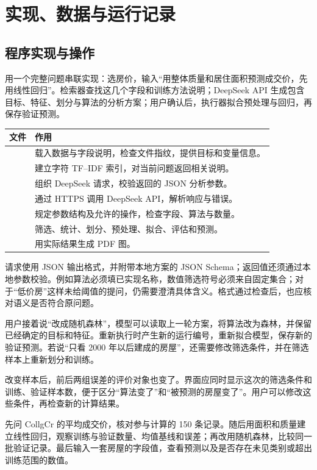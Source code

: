\section{实现、数据与运行记录}\label{app:implementation}
\subsection{程序实现与操作}
用一个完整问题串联实现：选房价，输入“用整体质量和居住面积预测成交价，先用线性回归”。检索器查找这几个字段和训练方法说明；DeepSeek API 生成包含目标、特征、划分与算法的分析方案；用户确认后，执行器拟合预处理与回归，再保存验证预测。
\begin{center}\small
\begin{tabularx}{\textwidth}{lY}
\toprule
文件 & 作用\\
\midrule
{} & 载入数据与字段说明，检查文件指纹，提供目标和变量信息。\\
 & 建立字符 TF--IDF 索引，对当前问题返回相关说明。\\
 & 组织 DeepSeek 请求，校验返回的 JSON 分析参数。\\
 & 通过 HTTPS 调用 DeepSeek API，解析响应与错误。\\
 & 规定参数结构及允许的操作，检查字段、算法与数量。\\
 & 筛选、统计、划分、预处理、拟合、评估和预测。\\
 & 用实际结果生成 PDF 图。\\
\bottomrule
\end{tabularx}
\end{center}
请求使用 JSON 输出格式，并附带本地方案的 JSON Schema；返回值还须通过本地参数校验。例如算法必须填已实现名称，数值筛选符号必须来自固定集合；对于“低价房”这样未给阈值的提问，仍需要澄清具体含义。格式通过检查后，也应核对语义是否符合原问题。

用户接着说“改成随机森林”，模型可以读取上一轮方案，将算法改为森林，并保留已经确定的目标和特征。重新执行时产生新的运行编号，重新拟合模型，保存新的验证预测。若说“只看 2000 年以后建成的房屋”，还需要修改筛选条件，并在筛选样本上重新划分和训练。

改变样本后，前后两组误差的评价对象也变了。界面应同时显示这次的筛选条件和训练、验证样本数，便于区分“算法变了”和“被预测的房屋变了”。用户可以修改这些条件，再检查新的计算结果。

先问 CollgCr 的平均成交价，核对参与计算的 150 条记录。随后用面积和质量建立线性回归，观察训练与验证数量、均值基线和误差；再改用随机森林，比较同一批验证记录。最后输入一套房屋的字段值，查看预测以及是否存在未见类别或超出训练范围的数值。

